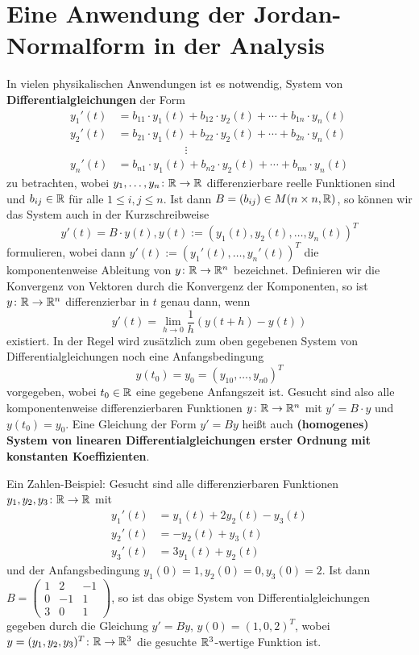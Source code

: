 \section{Eine Anwendung der Jordan-Normalform in der Analysis}
\label{sec:2.10}

In vielen physikalischen Anwendungen ist es notwendig, System von \textbf{Differentialgleichungen} der Form 
\begin{align*}
	y_1'(t) &= b_{11} \cdot y_1(t) + b_{12} \cdot y_2(t) + \cdots + b_{1n} \cdot y_n(t) \\
	y_2'(t) &= b_{21} \cdot y_1(t) + b_{22} \cdot y_2(t) + \cdots + b_{2n} \cdot y_n(t) \\
	 & \qquad \qquad \qquad \vdots \\
	y_n'(t) &= b_{n1} \cdot y_1(t) + b_{n2} \cdot y_2(t) + \cdots + b_{nn} \cdot y_n(t)
\end{align*}
zu betrachten, wobei $y_1,\dots,y_n\colon \mathbb{R} \rightarrow \mathbb{R}$ differenzierbare reelle Funktionen sind und $b_{ij} \in \mathbb{R}$ für alle $1 \leq i,j \leq n$.
Ist dann $B = (b_{ij}) \in M(n \times n, \mathbb{R})$, so können wir das System auch in der Kurzschreibweise
\[
	y'(t) = B \cdot y(t), y(t) := (y_1(t),y_2(t),\dots,y_n(t))^T
\]
formulieren, wobei dann $y'(t) := (y_1'(t),\dots,y_n'(t))^T$ die komponentenweise Ableitung von $y\colon \mathbb{R} \rightarrow \mathbb{R}^n$ bezeichnet.
Definieren wir die Konvergenz von Vektoren durch die Konvergenz der Komponenten, so ist $y \colon \mathbb{R} \rightarrow \mathbb{R}^n$ differenzierbar in $t$ genau dann, wenn
\[
	y'(t) = \lim\limits_{h \rightarrow 0} \frac{1}{h} (y(t+h)-y(t))
\]
existiert.
In der Regel wird zusätzlich zum oben gegebenen System von Differentialgleichungen noch eine Anfangsbedingung
\[
	y(t_0) = y_0 = (y_{10},\dots,y_{n0})^T
\]
vorgegeben, wobei $t_0 \in \mathbb{R}$ eine gegebene Anfangszeit ist.
Gesucht sind also alle komponentenweise differenzierbaren Funktionen $y \colon \mathbb{R} \rightarrow \mathbb{R}^n$ mit $y' = B \cdot y$ und $y(t_0) = y_0$.
Eine Gleichung der Form $y' = By$ heißt auch \textbf{(homogenes) System von linearen Differentialgleichungen erster Ordnung mit konstanten Koeffizienten}.

\begin{beispiel}
	\label{bsp:10.1}
	Ein Zahlen-Beispiel:
	Gesucht sind alle differenzierbaren Funktionen $y_1,y_2,y_3\colon \mathbb{R} \rightarrow \mathbb{R}$ mit
	\begin{align*}
		y_1'(t) &= y_1(t) + 2y_2(t) - y_3(t) \\
		y_2'(t) &= -y_2(t) + y_3(t) \\
		y_3'(t) &= 3y_1(t) + y_2(t)
	\end{align*}
	und der Anfangsbedingung $y_1(0) = 1, y_2(0) = 0, y_3(0)=2$.
	Ist dann $B = \begin{pmatrix}
		1 & 2 & -1 \\
		0 & -1 & 1 \\
		3 & 0 & 1
	\end{pmatrix}$, so ist das obige System von Differentialgleichungen gegeben durch die Gleichung $y' = By$, $y(0) = (1,0,2)^T$, wobei $y = (y_1,y_2,y_3)^T \colon \mathbb{R} \rightarrow \mathbb{R}^3$ die gesuchte $\mathbb{R}^3$-wertige Funktion ist.
\end{beispiel}

